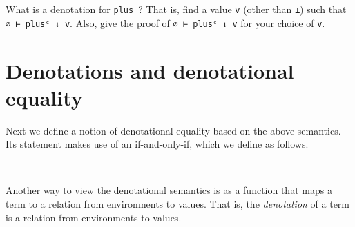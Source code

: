 What is a denotation for \texttt{plusᶜ}? That is, find a value
\texttt{v} (other than \texttt{⊥}) such that \texttt{∅\ ⊢\ plusᶜ\ ↓\ v}.
Also, give the proof of \texttt{∅\ ⊢\ plusᶜ\ ↓\ v} for your choice of
\texttt{v}.

\begin{fence}
\begin{code}%
\>[0]\<%
\end{code}
\end{fence}

\hypertarget{denotations-and-denotational-equality}{%
\section{Denotations and denotational
equality}\label{denotations-and-denotational-equality}}

Next we define a notion of denotational equality based on the above
semantics. Its statement makes use of an if-and-only-if, which we define
as follows.

\begin{fence}
\begin{code}%
\>[0]\AgdaSpace{}%
\AgdaSymbol{:}\AgdaSpace{}%
\AgdaSpace{}%
\AgdaSpace{}%
\AgdaSpace{}%
\AgdaSpace{}%
\<%
\\
\>[0]\AgdaSpace{}%
\AgdaSpace{}%
\AgdaSpace{}%
\AgdaSymbol{=}\AgdaSpace{}%
\AgdaSymbol{(}\AgdaSpace{}%
\AgdaSpace{}%
\AgdaSymbol{)}\AgdaSpace{}%
\AgdaSpace{}%
\AgdaSymbol{(}\AgdaSpace{}%
\AgdaSpace{}%
\AgdaSymbol{)}\<%
\end{code}
\end{fence}

Another way to view the denotational semantics is as a function that
maps a term to a relation from environments to values. That is, the
\emph{denotation} of a term is a relation from environments to values.

\begin{fence}
\begin{code}%
\>[0]\AgdaSpace{}%
\AgdaSymbol{:}\AgdaSpace{}%
\AgdaSpace{}%
\AgdaSpace{}%
\<%
\\
\>[0]\AgdaSpace{}%
\AgdaSpace{}%
\AgdaSymbol{=}\AgdaSpace{}%
\AgdaSymbol{(}\AgdaSpace{}%
\AgdaSpace{}%
\AgdaSpace{}%
\AgdaSpace{}%
\AgdaSpace{}%
\AgdaSymbol{)}\<%
\end{code}
\end{fence}

